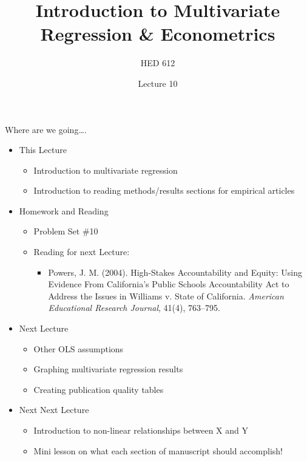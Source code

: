 \documentclass[
  8pt,
  ignorenonframetext,
  dvipsnames]{beamer}
\title{Introduction to Multivariate Regression \& Econometrics}
\subtitle{HED 612}
\author{Lecture 10}
\date{}
\providecommand{\tightlist}{%
  \setlength{\itemsep}{0pt}\setlength{\parskip}{0pt}}
\let\olditem\item
\renewcommand{\item}{%
  \olditem\vspace{4pt}
}
\begin{document}
\frame{\titlepage}

\begin{frame}
  \tableofcontents[hideallsubsections]
\end{frame}
\begin{frame}{Where are we going\ldots.}
\protect\hypertarget{where-are-we-going.}{}

\begin{itemize}
\tightlist
\item
  This Lecture

  \begin{itemize}
  \tightlist
  \item
    Introduction to multivariate regression
  \item
    Introduction to reading methods/results sections for empirical
    articles
  \end{itemize}
\item
  Homework and Reading

  \begin{itemize}
  \tightlist
  \item
    Problem Set \#10
  \item
    Reading for next Lecture:

    \begin{itemize}
    \tightlist
    \item
      Powers, J. M. (2004). High-Stakes Accountability and Equity: Using
      Evidence From California's Public Schools Accountability Act to
      Address the Issues in Williams v. State of California.
      \emph{American Educational Research Journal}, 41(4), 763--795.
    \end{itemize}
  \end{itemize}
\item
  Next Lecture

  \begin{itemize}
  \tightlist
  \item
    Other OLS assumptions
  \item
    Graphing multivariate regression results
  \item
    Creating publication quality tables
  \end{itemize}
\item
  Next Next Lecture

  \begin{itemize}
  \tightlist
  \item
    Introduction to non-linear relationships between X and Y
  \item
    Mini lesson on what each section of manuscript should accomplish!
  \end{itemize}
\end{itemize}

\end{frame}
\end{document}
